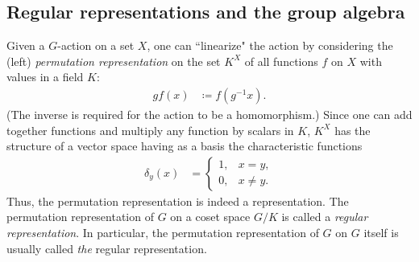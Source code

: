 \subsection{Regular representations and the group algebra}\label{ch2:regular}

Given a $G$-action on a set $X$, one can ``linearize" the action by considering the (left) \emph{permutation representation} on the set $K^X$ of all functions $f$ on $X$ with values in a field $K$:
\begin{align}
	gf(x) &\coloneqq f(g^{-1}x).
\end{align}
(The inverse is required for the action to be a homomorphism.) Since one can add together functions and multiply any function by scalars in $K$, $K^X$ has the structure of a vector space having as a basis the characteristic functions
\begin{align}
	\delta_y (x) &= 
		\begin{cases}
			1, & x = y, \\
			0, & x \neq y.
		\end{cases}
\end{align}
Thus, the permutation representation is indeed a representation. The permutation representation of $G$ on a coset space $G/K$ is called a \emph{regular representation}. In particular, the permutation representation of $G$ on $G$ itself is usually called \emph{the} regular representation. 



